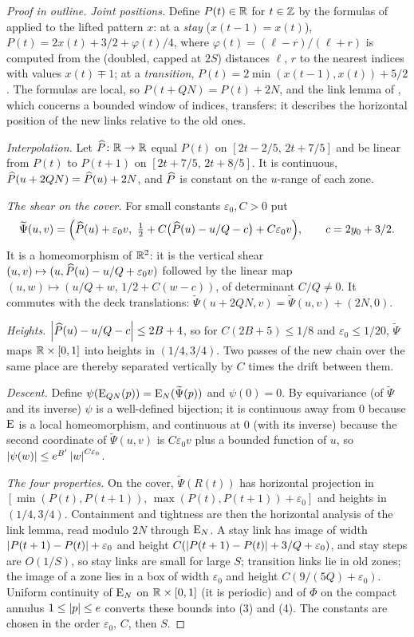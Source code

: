 \begin{proof}[Proof in outline]
\emph{Joint positions.} Define $P(t)\in\mathbb{R}$ for $t\in\mathbb{Z}$ by the formulas of  applied to the lifted pattern $x$: at a \emph{stay} ($x(t-1)=x(t)$),
$P(t)=2x(t)+3/2+\varphi(t)/4$, where $\varphi(t)=(\ell-r)/(\ell+r)$ is computed from the (doubled, capped at $2S$) distances $\ell$, $r$ to the nearest indices with values $x(t)\mp1$;
at a \emph{transition}, $P(t)=2\min(x(t-1),x(t))+5/2$. The formulas are local, so $P(t+QN)=P(t)+2N$, and the link lemma of , which concerns a bounded window of
indices, transfers: it describes the horizontal position of the new links relative to the old ones.

\emph{Interpolation.} Let $\widehat{P}\colon\mathbb{R}\to\mathbb{R}$ equal $P(t)$ on $[2t-2/5,\,2t+7/5]$ and be linear from $P(t)$ to $P(t+1)$ on $[2t+7/5,\,2t+8/5]$. It is continuous, $\widehat{P}(u+2QN)=\widehat{P}(u)+2N$,
and $\widehat{P}$ is constant on the $u$-range of each zone.

\emph{The shear on the cover.} For small constants $\varepsilon_0,C>0$ put
\[
\widetilde\Psi(u,v)=\Bigl(\Ph(u)+\varepsilon_0v,\ \tfrac12+C\bigl(\Ph(u)-u/Q-c\bigr)+C\varepsilon_0v\Bigr),\qquad c=2y_0+3/2.
\]
It is a homeomorphism of $\mathbb{R}^2$: it is the vertical shear $(u,v)\mapsto(u,\widehat{P}(u)-u/Q+\varepsilon_0v)$ followed by the linear map $(u,w)\mapsto(u/Q+w,\,1/2+C(w-c))$, of determinant
$C/Q\neq0$. It commutes with the deck translations: $\widetilde\Psi(u+2QN,v)=\widetilde\Psi(u,v)+(2N,0)$.

\emph{Heights.} $\left\lvert \widehat{P}(u)-u/Q-c\right\rvert\le2B+4$, so for $C(2B+5)\le1/8$ and $\varepsilon_0\le1/20$, $\widetilde\Psi$ maps $\mathbb{R}\times[0,1]$ into heights in $(1/4,3/4)$. Two passes of the new chain
over the same place are thereby separated vertically by $C$ times the drift between them.

\emph{Descent.} Define $\psi(\operatorname{E}_{QN}(p))=\operatorname{E}_N(\widetilde\Psi(p))$ and $\psi(0)=0$. By equivariance (of $\widetilde\Psi$ and its inverse) $\psi$ is a well-defined bijection; it is
continuous away from $0$ because $\operatorname{E}$ is a local homeomorphism, and continuous at $0$ (with its inverse) because the second coordinate of $\widetilde\Psi(u,v)$ is $C\varepsilon_0v$ plus a
bounded function of $u$, so $\left\lvert \psi(w)\right\rvert\le e^{B'}\left\lvert w\right\rvert^{C\varepsilon_0}$.

\emph{The four properties.} On the cover, $\widetilde\Psi(R(t))$ has horizontal projection in $[\min(P(t),P(t+1)),\,\max(P(t),P(t+1))+\varepsilon_0]$ and heights in $(1/4,3/4)$. Containment
and tightness are then the horizontal analysis of the link lemma, read modulo $2N$ through $\operatorname{E}_N$. A stay link has image of width $\left\lvert P(t+1)-P(t)\right\rvert+\varepsilon_0$ and height
$C(\left\lvert P(t+1)-P(t)\right\rvert+3/Q+\varepsilon_0)$, and stay steps are $O(1/S)$, so stay links are small for large $S$; transition links lie in old zones; the image of a zone lies in a box of width
$\varepsilon_0$ and height $C(9/(5Q)+\varepsilon_0)$. Uniform continuity of $\operatorname{E}_N$ on $\mathbb{R}\times[0,1]$ (it is periodic) and of $\Phi$ on the compact annulus $1\le\left\lvert p\right\rvert\le e$ converts these
bounds into (3) and (4). The constants are chosen in the order $\varepsilon_0$, $C$, then $S$.
\end{proof}

